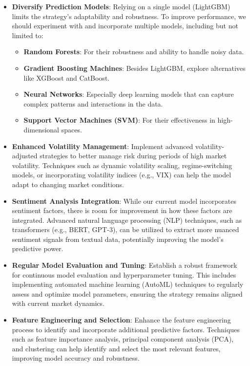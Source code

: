 \documentclass[conference]{IEEEtran}
\begin{document}
\begin{itemize}
    \item \textbf{Diversify Prediction Models}: Relying on a single model (LightGBM) limits the strategy's adaptability and robustness. To improve performance, we should experiment with and incorporate multiple models, including but not limited to:
    \begin{itemize}
        \item \textbf{Random Forests}: For their robustness and ability to handle noisy data.
        \item \textbf{Gradient Boosting Machines}: Besides LightGBM, explore alternatives like XGBoost and CatBoost.
        \item \textbf{Neural Networks}: Especially deep learning models that can capture complex patterns and interactions in the data.
        \item \textbf{Support Vector Machines (SVM)}: For their effectiveness in high-dimensional spaces.
    \end{itemize}
    \item \textbf{Enhanced Volatility Management}: Implement advanced volatility-adjusted strategies to better manage risk during periods of high market volatility. Techniques such as dynamic volatility scaling, regime-switching models, or incorporating volatility indices (e.g., VIX) can help the model adapt to changing market conditions.
    \item \textbf{Sentiment Analysis Integration}: While our current model incorporates sentiment factors, there is room for improvement in how these factors are integrated. Advanced natural language processing (NLP) techniques, such as transformers (e.g., BERT, GPT-3), can be utilized to extract more nuanced sentiment signals from textual data, potentially improving the model's predictive power.
    \item \textbf{Regular Model Evaluation and Tuning}: Establish a robust framework for continuous model evaluation and hyperparameter tuning. This includes implementing automated machine learning (AutoML) techniques to regularly assess and optimize model parameters, ensuring the strategy remains aligned with current market dynamics.
    \item \textbf{Feature Engineering and Selection}: Enhance the feature engineering process to identify and incorporate additional predictive factors. Techniques such as feature importance analysis, principal component analysis (PCA), and clustering can help identify and select the most relevant features, improving model accuracy and robustness.
\end{itemize}
\end{document}
